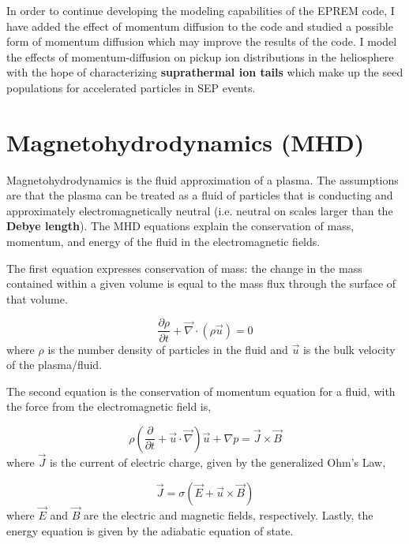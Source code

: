\documentclass[%
 reprint,
 amsmath,amssymb,
 aps,
]{revtex4-1}
\begin{document}
In order to continue developing the modeling capabilities of the EPREM code, I have added the effect of momentum diffusion to the code and studied a possible form of momentum diffusion which may improve the results of the code. I model the effects of momentum-diffusion on pickup ion distributions in the heliosphere with the hope of characterizing \textbf{suprathermal ion tails} which make up the seed populations for accelerated particles in SEP events. 


\section{Magnetohydrodynamics (MHD)}

Magnetohydrodynamics is the fluid approximation of a plasma. The assumptions are that the plasma can be treated as a fluid of particles that is conducting and approximately electromagnetically neutral (i.e. neutral on scales larger than the \textbf{Debye length}). The MHD equations explain the conservation of mass, momentum, and energy of the fluid in the electromagnetic fields. 

The first equation expresses conservation of mass: the change in the mass contained within a given volume is equal to the mass flux through the surface of that volume.

\begin{equation}
\frac{\partial \rho}{\partial t} + \vec{\nabla} \cdot \left(\rho \vec{u}\right) = 0 
\end{equation}
where $\rho$ is the number density of particles in the fluid and $\vec{u}$ is the bulk velocity of the plasma/fluid.


The second equation is the conservation of momentum equation for a fluid, with the force from the electromagnetic field is,

\begin{equation}
\rho \left( \frac{\partial}{\partial t} + \vec{u} \cdot \vec{\nabla}\right) \vec{u} + \nabla p = \vec{J} \times \vec{B}
\end{equation}
where $\vec{J}$ is the current of electric charge, given by the generalized Ohm's Law,

\begin{equation}
\vec{J} = \sigma \left(\vec{E} + \vec{u} \times \vec{B}\right)
\end{equation}
where $\vec{E}$ and $\vec{B}$ are the electric and magnetic fields, respectively. Lastly, the energy equation is given by the adiabatic equation of state.
\end{document}
